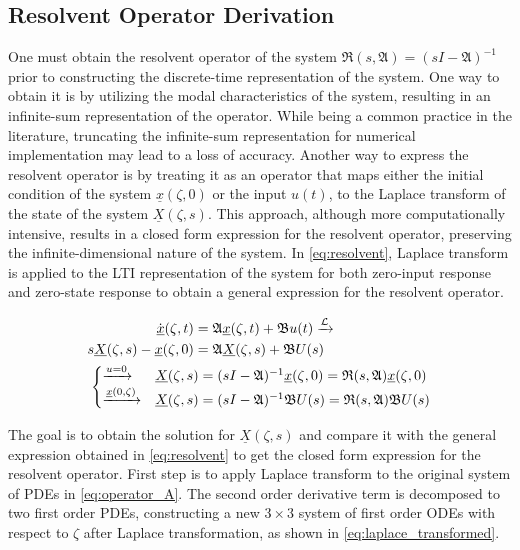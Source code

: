 \subsection{Resolvent Operator Derivation} \label{app:resolvent}

One must obtain the resolvent operator of the system $\mathfrak{R}(s, \mathfrak{A}) = (sI-\mathfrak{A})^{-1}$ prior to constructing the discrete-time representation of the system. One way to obtain it is by utilizing the modal characteristics of the system, resulting in an infinite-sum representation of the operator. While being a common practice in the literature, truncating the infinite-sum representation for numerical implementation may lead to a loss of accuracy. Another way to express the resolvent operator is by treating it as an operator that maps either the initial condition of the system $\underline{x}(\zeta,0)$ or the input $u(t)$, to the Laplace transform of the state of the system $\underline{X}(\zeta, s)$. This approach, although more computationally intensive, results in a closed form expression for the resolvent operator, preserving the infinite-dimensional nature of the system. In \eqref{eq:resolvent}, Laplace transform is applied to the LTI representation of the system for both zero-input response and zero-state response to obtain a general expression for the resolvent operator.

\begin{equation} \label{eq:resolvent}
    \begin{aligned}
        \dot{\underline{x}}(\zeta, t) &= \mathfrak{A} \underline{x}(\zeta, t) + \mathfrak{B} u(t) \xrightarrow{\mathcal{L}}\\
        s \underline{X}(\zeta,s) - \underline{x}(\zeta,0) &= \mathfrak{A} \underline{X}(\zeta,s) + \mathfrak{B} U(s)\\
        &\hspace{-7.5em}\begin{cases}
            \xrightarrow{u = 0} &\underline{X}(\zeta,s) = (sI - \mathfrak{A})^{-1} \underline{x}(\zeta,0) = \mathfrak{R}(s, \mathfrak{A}) \underline{x}(\zeta,0)\\
            \xrightarrow{\underline{x}(0, \zeta)}& \underline{X}(\zeta,s) = (sI - \mathfrak{A})^{-1} \mathfrak{B} U(s) = \mathfrak{R}(s, \mathfrak{A}) \mathfrak{B} U(s)
        \end{cases}
    \end{aligned}
    \end{equation}
    
    The goal is to obtain the solution for $\underline{X}(\zeta, s)$ and compare it with the general expression obtained in \eqref{eq:resolvent} to get the closed form expression for the resolvent operator. First step is to apply Laplace transform to the original system of PDEs in \eqref{eq:operator_A}. The second order derivative term is decomposed to two first order PDEs, constructing a new $3 \times 3$ system of first order ODEs with respect to $\zeta$ after Laplace transformation, as shown in \eqref{eq:laplace_transformed}.
    
